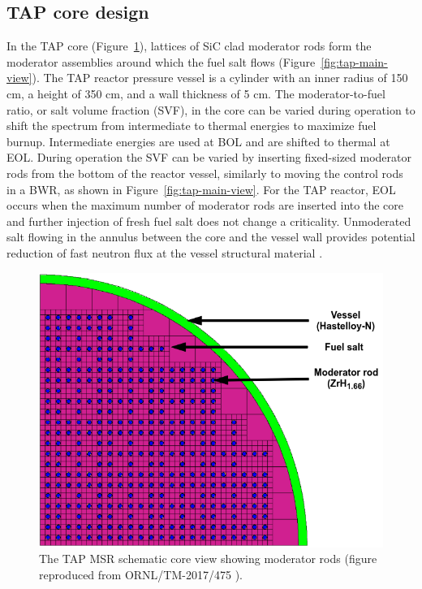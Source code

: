 \documentclass[12pt]{article} %
\begin{document}
\subsection{TAP core design}
In the \gls{TAP} core (Figure~\ref{fig:tap-core-view}), lattices of SiC clad 
moderator rods form the moderator assemblies around which the fuel salt flows  
(Figure~\ref{fig:tap-main-view}). The \gls{TAP} reactor pressure vessel is a 
cylinder with an inner radius of 150 cm, a height of 350 cm, and a wall 
thickness of 5 cm. The moderator-to-fuel ratio, or salt volume fraction 
(SVF), in the core can be varied during operation to shift the spectrum from 
intermediate to thermal energies to maximize fuel burnup. Intermediate 
energies are used at \gls{BOL} and are shifted to thermal at \gls{EOL}. During 
operation the SVF can be varied by inserting fixed-sized moderator rods from 
the bottom of the reactor vessel, similarly to moving the control rods in 
a \gls{BWR}, as shown in Figure~\ref{fig:tap-main-view}. For the \gls{TAP} 
reactor, \gls{EOL} occurs when the maximum number of moderator rods are 
inserted into the core and further injection of fresh fuel salt does not 
change a criticality. Unmoderated salt flowing in the annulus between the core 
and the vessel wall provides potential reduction of fast neutron flux at the 
vessel structural material  
\cite{transatomic_power_corporation_neutronics_2016}.
\begin{figure}[t] %
		  \includegraphics[width=\textwidth]{tap_core_ornl.png}
	  	\vspace{-0.35in}
  \caption{The \gls{TAP} \gls{MSR} schematic core view showing moderator rods 
  (figure reproduced from ORNL/TM-2017/475  
\cite{betzler_assessment_2017}).}
  \label{fig:tap-core-view}
\end{figure}
\end{document}
